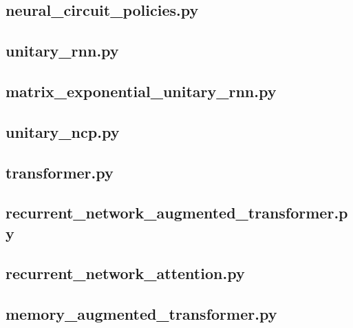 \documentclass[draft,final]{vutinfth} %
\begin{document}
    \subsection{neural\_circuit\_policies.py}
    
    \subsection{unitary\_rnn.py}
    
    \subsection{matrix\_exponential\_unitary\_rnn.py}
    
    \subsection{unitary\_ncp.py}
    
    \subsection{transformer.py}
    
    \subsection{recurrent\_network\_augmented\_transformer.py}
    
    \subsection{recurrent\_network\_attention.py}
    
    \subsection{memory\_augmented\_transformer.py}
    
\end{document}
